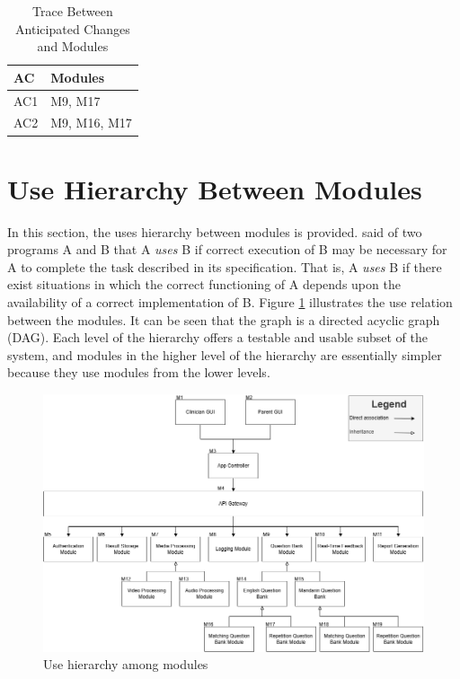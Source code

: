 \documentclass[12pt, titlepage]{article}
\begin{document}
\begin{table}[H]
\centering
\begin{tabular}{p{} p{}}
\toprule
\textbf{AC} & \textbf{Modules}\\
\midrule
AC1 & M9, M17 \\
AC2 & M9, M16, M17 \\
\end{tabular}
\caption{Trace Between Anticipated Changes and Modules}
\label{TblACT}
\end{table}

\section{Use Hierarchy Between Modules} \label{SecUse}

In this section, the uses hierarchy between modules is
provided. \citet{Parnas1978} said of two programs A and B that A {\em uses} B if
correct execution of B may be necessary for A to complete the task described in
its specification. That is, A {\em uses} B if there exist situations in which
the correct functioning of A depends upon the availability of a correct
implementation of B.  Figure \ref{FigUH} illustrates the use relation between
the modules. It can be seen that the graph is a directed acyclic graph
(DAG). Each level of the hierarchy offers a testable and usable subset of the
system, and modules in the higher level of the hierarchy are essentially simpler
because they use modules from the lower levels.



\begin{figure}[H]
  \centering
  \includegraphics[scale=0.5]{images/Module Hierachy.drawio.png}
  \caption{Use hierarchy among modules}
  \label{FigUH}
\end{figure}
\end{document}
